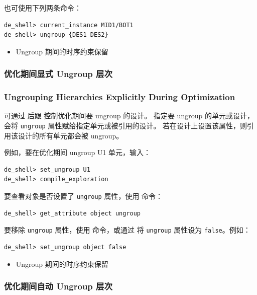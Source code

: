 也可使用下列两条命令：
\begin{lstlisting}
de_shell> current_instance MID1/BOT1
de_shell> ungroup {DES1 DES2}
\end{lstlisting}

\begin{seeAlsoBox}
\begin{itemize}
  \item Ungroup 期间的时序约束保留
\end{itemize}
\end{seeAlsoBox}

\subsubsection{优化期间显式 Ungroup 层次}
\subsubsection*{Ungrouping Hierarchies Explicitly During Optimization}

可通过  后跟  控制优化期间要 ungroup 的设计。
指定要 ungroup 的单元或设计， 会将 \texttt{ungroup} 属性赋给指定单元或被引用的设计。
若在设计上设置该属性，则引用该设计的所有单元都会被 ungroup。

例如，要在优化期间 ungroup U1 单元，输入：
\begin{lstlisting}
de_shell> set_ungroup U1
de_shell> compile_exploration
\end{lstlisting}

要查看对象是否设置了 \texttt{ungroup} 属性，使用  命令：
\begin{lstlisting}
de_shell> get_attribute object ungroup
\end{lstlisting}

要移除 \texttt{ungroup} 属性，使用  命令，或通过  将 \texttt{ungroup} 属性设为 \texttt{false}。例如：
\begin{lstlisting}
de_shell> set_ungroup object false
\end{lstlisting}

\begin{seeAlsoBox}
\begin{itemize}
  \item Ungroup 期间的时序约束保留
\end{itemize}
\end{seeAlsoBox}

\subsubsection{优化期间自动 Ungroup 层次}
